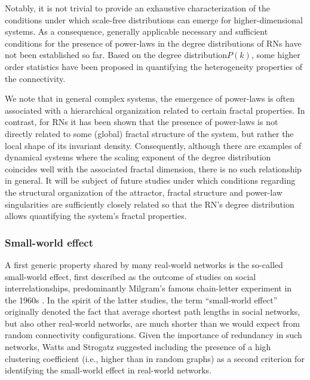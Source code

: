 		Notably, it is not trivial to provide an exhaustive characterization of the conditions under which scale-free distributions can emerge for higher-dimensional systems. As a consequence, generally applicable necessary and sufficient conditions for the presence of power-laws in the degree distributions of RNs have not been established so far. Based on the degree distribution$P(k)$, some higher order statistics have been proposed in \cite{Jocob2016} quantifying the heterogeneity properties of the connectivity. 

		We note that in general complex systems, the emergence of power-laws is often associated with a hierarchical organization related to certain fractal properties. In contrast, for RNs it has been shown that the presence of power-laws is not directly related to some (global) fractal structure of the system, but rather the local shape of its invariant density. Consequently, although there are examples of dynamical systems where the scaling exponent of the degree distribution coincides well with the associated fractal dimension, there is no such relationship in general. It will be subject of future studies under which conditions regarding the structural organization of the attractor, fractal structure and power-law singularities are sufficiently closely related so that the RN's degree distribution allows quantifying the system's fractal properties.
        
       		 \subsubsection{Small-world effect}
		A first generic property shared by many real-world networks is the so-called small-world effect, first described as the outcome of studies on social interrelationships, predominantly Milgram's famous chain-letter experiment in the 1960s \cite{Milgram1967}. In the spirit of the latter studies, the term ``small-world effect'' originally denoted the fact that average shortest path lengths in social networks, but also other real-world networks, are much shorter than we would expect from random connectivity configurations. Given the importance of redundancy in such networks, Watts and Strogatz \cite{Watts1998} suggested including the presence of a high clustering coefficient (i.e., higher than in random graphs) as a second criterion for identifying the small-world effect in real-world networks.

